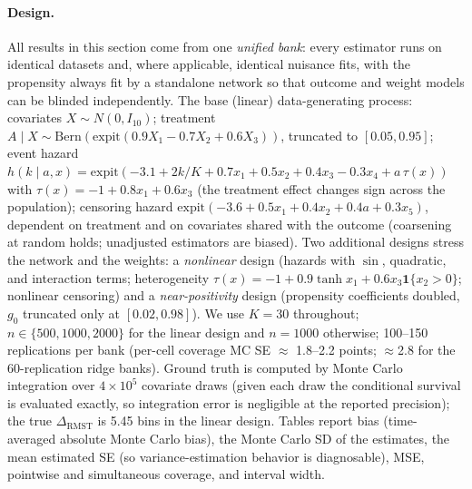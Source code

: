 \documentclass[11pt]{article}
\theoremstyle{remark}
\newcommand{\ind}{\mathbf{1}}
\begin{document}
\paragraph{Design.} All results in this section come from one \emph{unified bank}: every estimator runs on identical datasets and, where applicable, identical nuisance fits, with the propensity always fit by a standalone network so that outcome and weight models can be blinded independently. The base (linear) data-generating process: covariates $X\sim N(0, I_{10})$; treatment $A\mid X \sim \mathrm{Bern}(\mathrm{expit}(0.9X_1 - 0.7X_2 + 0.6X_3))$, truncated to $[0.05, 0.95]$; event hazard $h(k\mid a,x) = \mathrm{expit}(-3.1 + 2k/K + 0.7x_1 + 0.5x_2 + 0.4x_3 - 0.3x_4 + a\,\tau(x))$ with $\tau(x) = -1 + 0.8x_1 + 0.6x_3$ (the treatment effect changes sign across the population); censoring hazard $\mathrm{expit}(-3.6 + 0.5x_1 + 0.4x_2 + 0.4a + 0.3x_5)$, dependent on treatment and on covariates shared with the outcome (coarsening at random holds; unadjusted estimators are biased). Two additional designs stress the network and the weights: a \emph{nonlinear} design (hazards with $\sin$, quadratic, and interaction terms; heterogeneity $\tau(x) = -1 + 0.9\tanh x_1 + 0.6 x_3 \ind\{x_2>0\}$; nonlinear censoring) and a \emph{near-positivity} design (propensity coefficients doubled, $g_0$ truncated only at $[0.02, 0.98]$). We use $K=30$ throughout; $n\in\{500, 1000, 2000\}$ for the linear design and $n=1000$ otherwise; 100--150 replications per bank (per-cell coverage MC SE $\approx$ 1.8--2.2 points; $\approx$2.8 for the 60-replication ridge banks). Ground truth is computed by Monte Carlo integration over $4\times10^5$ covariate draws (given each draw the conditional survival is evaluated exactly, so integration error is negligible at the reported precision); the true $\Delta_{\mathrm{RMST}}$ is 5.45 bins in the linear design. Tables report bias (time-averaged absolute Monte Carlo bias), the Monte Carlo SD of the estimates, the mean estimated SE (so variance-estimation behavior is diagnosable), MSE, pointwise and simultaneous coverage, and interval width.
\end{document}
